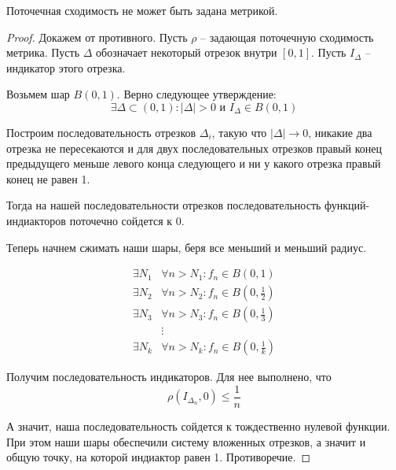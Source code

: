 \documentclass[../functional-analysis_17-18.tex]{subfiles}
\begin{document}
	\begin{statement}
		Поточечная сходимость не может быть задана метрикой.
	\end{statement}
	\begin{proof}
		Докажем от противного. Пусть $\rho$ --  задающая поточечную сходимость метрика.
		Пусть $\Delta$ обозначает некоторый отрезок внутри $[0, 1]$. Пусть $I_\Delta$ --  индикатор этого отрезка.
		
		Возьмем шар $B(0, 1)$. Верно следующее утверждение:
		\begin{equation}
			\exists \Delta \subset (0, 1): |\Delta| > 0 \text{ и } I_\Delta \in B(0, 1)
		\end{equation}
		
		Построим последовательность отрезков $\Delta_i$, такую что $|\Delta| \to 0$, никакие два отрезка не пересекаются и для двух последовательных отрезков правый конец предыдущего меньше левого конца следующего и ни у какого отрезка правый конец не равен 1.
		
		
		Тогда на нашей последовательности отрезков последовательность функций-индиакторов поточечно сойдется к 0.
		
		Теперь начнем сжимать наши шары, беря все меньший и меньший радиус.
		
        \begin{equation}
			\begin{aligned}
				\exists N_1& \forall n > N_1: f_n \in B(0, 1) \\
				\exists N_2& \forall n > N_2: f_n \in B\left(0, \frac{1}{2}\right) \\
				\exists N_3& \forall n > N_3: f_n \in B\left(0, \frac{1}{3}\right) \\
				&\vdots\\
				\exists N_k& \forall n > N_k: f_n \in B\left(0, \frac{1}{k}\right)
			\end{aligned}
		\end{equation}
		
        Получим последовательность индикаторов. Для нее выполнено, что
        \begin{equation}
            \rho\left( I_{\Delta_n}, 0 \right) \leq \frac{1}{n}
        \end{equation}
        
        А значит, наша последовательность сойдется к тождественно нулевой функции. При этом наши шары обеспечили систему вложенных отрезков, а значит и общую точку, на которой индиактор равен 1. Противоречие.
	\end{proof}
	
\end{document}
